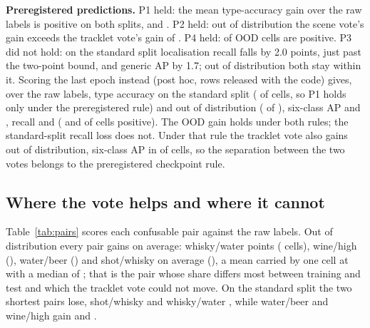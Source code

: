 \documentclass{article}
\begin{document}
\noindent\textbf{Preregistered predictions.} P1 held: the mean type-accuracy gain over the raw labels is positive on both splits, \SvTypeStdVsRawGain{} and \SvTypeOODVsRawGain. P2 held: out of distribution the scene vote's gain exceeds the tracklet vote's gain of \SvTypeOODTrkVsRawGain. P4 held: \SvTypeOODVsRawPos{} of \SvCells{} OOD cells are positive. P3 did not hold: on the standard split localisation recall falls by 2.0 points, just past the two-point bound, and generic AP by 1.7; out of distribution both stay within it. Scoring the last epoch instead (post hoc, rows released with the code) gives, over the raw labels, type accuracy \SvLTypeStdVsRawGainL{} on the standard split (\SvLTypeStdVsRawPosL{} of \SvLCells{} cells, so P1 holds only under the preregistered rule) and \SvLTypeOODVsRawGainL{} out of distribution (\SvLTypeOODVsRawPosL{} of \SvLCells), six-class AP \SvLSixStdVsRawGainL{} and \SvLSixOODVsRawGainL, recall \SvLRecStdVsRawGainL{} and \SvLRecOODVsRawGainL{} (\SvLRecStdVsRawPosL{} and \SvLRecOODVsRawPosL{} of \SvLCells{} cells positive). The OOD gain holds under both rules; the standard-split recall loss does not. Under that rule the tracklet vote also gains out of distribution, six-class AP \TrkLSixOODVsRawGainL{} in \TrkLSixOODVsRawPosL{} of \SvLCells{} cells, so the separation between the two votes belongs to the preregistered checkpoint rule.

\subsection{Where the vote helps and where it cannot}
\label{sec:pairs}
Table~\ref{tab:pairs} scores each confusable pair against the raw labels. Out of distribution every pair gains on average: whisky/water \PairSWhiskyOODMean{} points (\PairSWhiskyOODPos{} cells), wine/high \PairSWineOODMean{} (\PairSWineOODPos), water/beer \PairSWaterOODMean{} (\PairSWaterOODPos) and shot/whisky \PairSShotOODMean{} on average (\PairSShotOODPos), a mean carried by one cell at \PairSShotOODMax{} with a median of \PairSShotOODMedian; that is the pair whose share differs most between training and test and which the tracklet vote could not move. On the standard split the two shortest pairs lose, shot/whisky \PairSShotStdMean{} and whisky/water \PairSWhiskyStdMean, while water/beer and wine/high gain \PairSWaterStdMean{} and \PairSWineStdMean.
\end{document}
